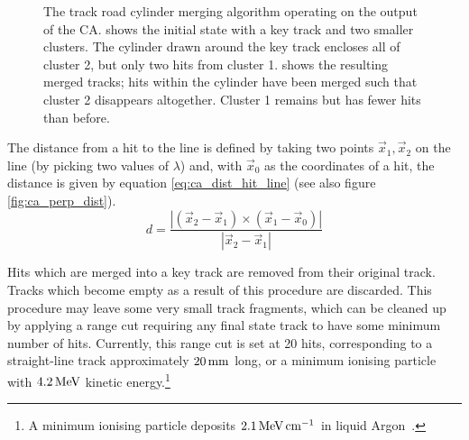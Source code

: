 \begin{figure}
\centering
{}
\caption[Track road merging algorithm operating on clustered hits]{\label{fig:ca_merging_cylinder}The track road cylinder merging algorithm operating on the output of the \ac{CA}.  shows the initial state with a key track and two smaller clusters. The cylinder drawn around the key track encloses all of cluster 2, but only two hits from cluster 1.  shows the resulting merged tracks; hits within the cylinder have been merged such that cluster 2 disappears altogether. Cluster 1 remains but has fewer hits than before.}
\end{figure}

The distance from a hit to the line is defined by taking two points $\vec{x}_1, \vec{x}_2$ on the line (by picking two values of $\lambda$) and, with $\vec{x}_0$ as the coordinates of a hit, the distance is given by equation \ref{eq:ca_dist_hit_line} (see also figure \ref{fig:ca_perp_dist}).
\begin{equation}\label{eq:ca_dist_hit_line}
d = \frac{|(\vec{x}_2 - \vec{x}_1) \times (\vec{x}_1 - \vec{x}_0)|}{|\vec{x}_2 - \vec{x}_1|}
\end{equation}

Hits which are merged into a key track are removed from their original track. Tracks which become empty as a result of this procedure are discarded. This procedure may leave some very small track fragments, which can be cleaned up by applying a range cut requiring any final state track to have some minimum number of hits. Currently, this range cut is set at 20 hits, corresponding to a straight-line track approximately $20\,\mathrm{mm}$ long, or a minimum ionising particle with $4.2\,\mathrm{MeV}$ kinetic energy.\footnote{A minimum ionising particle deposits $2.1\,\mathrm{MeV} \,\mathrm{cm}^{-1}$ in liquid Argon~\citep{Aprile2006}.}

